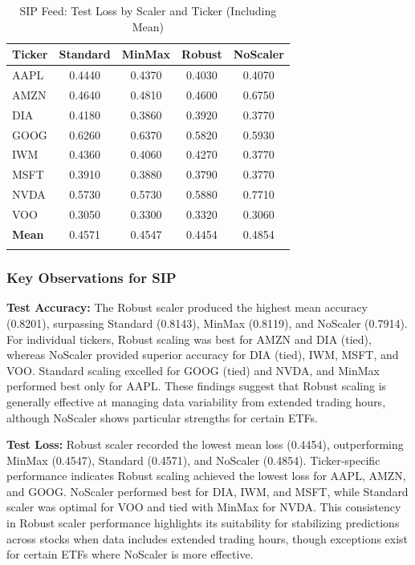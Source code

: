 \documentclass[10pt,a4paper]{article}
\begin{document}
\begin{table}[H]
\centering
{}
\caption{SIP Feed: Test Loss by Scaler and Ticker (Including Mean)}
\begin{tabular}{lcccc}
\toprule
\textbf{Ticker} & \textbf{Standard} & \textbf{MinMax} & \textbf{Robust} & \textbf{NoScaler} \\
\midrule
AAPL  & 0.4440 & 0.4370 & \cellcolor{lightblue}0.4030 & 0.4070 \\
AMZN  & 0.4640 & 0.4810 & \cellcolor{lightblue}0.4600 & 0.6750 \\
DIA   & 0.4180 & 0.3860 & 0.3920 & \cellcolor{lightblue}0.3770 \\
GOOG  & 0.6260 & 0.6370 & \cellcolor{lightblue}0.5820 & 0.5930 \\
IWM   & 0.4360 & 0.4060 & 0.4270 & \cellcolor{lightblue}0.3770 \\
MSFT  & 0.3910 & 0.3880 & 0.3790 & \cellcolor{lightblue}0.3770 \\
NVDA  & \cellcolor{lightblue}0.5730 & \cellcolor{lightblue}0.5730 & 0.5880 & 0.7710 \\
VOO   & \cellcolor{lightblue}0.3050 & 0.3300 & 0.3320 & 0.3060 \\
\midrule
\textbf{Mean} & 0.4571 & 0.4547 & \cellcolor{lightblue}0.4454 & 0.4854 \\
\bottomrule
\label{tab:sip_loss}
\end{tabular}
\end{table}

\subsubsection*{Key Observations for SIP}

\textbf{Test Accuracy:} The Robust scaler produced the highest mean accuracy (0.8201), surpassing Standard (0.8143), MinMax (0.8119), and NoScaler (0.7914). For individual tickers, Robust scaling was best for AMZN and DIA (tied), whereas NoScaler provided superior accuracy for DIA (tied), IWM, MSFT, and VOO. Standard scaling excelled for GOOG (tied) and NVDA, and MinMax performed best only for AAPL. These findings suggest that Robust scaling is generally effective at managing data variability from extended trading hours, although NoScaler shows particular strengths for certain ETFs.

\textbf{Test Loss:} Robust scaler recorded the lowest mean loss (0.4454), outperforming MinMax (0.4547), Standard (0.4571), and NoScaler (0.4854). Ticker-specific performance indicates Robust scaling achieved the lowest loss for AAPL, AMZN, and GOOG. NoScaler performed best for DIA, IWM, and MSFT, while Standard scaler was optimal for VOO and tied with MinMax for NVDA. This consistency in Robust scaler performance highlights its suitability for stabilizing predictions across stocks when data includes extended trading hours, though exceptions exist for certain ETFs where NoScaler is more effective.
\end{document}
